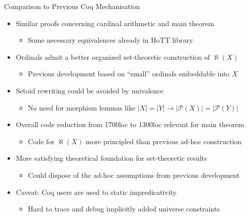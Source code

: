 \documentclass[xcolor=dvipsnames,compress,aspectratio=169,handout]{beamer}
\newcommand{\MCL}[1]{\ensuremath{\mathcal{#1}}\xspace} %
\newcommand{\Pow}{\MCL P}
\begin{document}
\begin{frame}{Comparison to Previous Coq Mechanisation}
	\pause
	\begin{itemize}
		\item
		Similar proofs concerning cardinal arithmetic and main theorem
		\begin{itemize}
			\item Some necessary equivalences already in HoTT library
		\end{itemize}
		\vspace{0.2cm}
		\pause
		\item
		Ordinals admit a better organized set-theoretic construction of $\aleph(X)$
		\begin{itemize}
			\item Previous development based on ``small'' ordinals embeddable into $X$
		\end{itemize}
		\vspace{0.2cm}
		\pause
		\item
		Setoid rewriting could be avoided by univalence
		\begin{itemize}
			\item No need for morphism lemmas like $|X|=|Y|\to |\Pow(X)|=|\Pow(Y)|$
		\end{itemize}
		\vspace{0.2cm}
		\pause
		\item
		Overall code reduction from 1700loc to 1300loc relevant for main theorem
		\begin{itemize}
			\item Code for $\aleph(X)$ more principled than previous ad-hoc construction
		\end{itemize}
		\vspace{0.2cm}
		\pause
		\item
		More satisfying theoretical foundation for set-theoretic results
		\begin{itemize}
			\item
			Could dispose of the ad-hoc assumptions from previous development
		\end{itemize}
		\vspace{0.2cm}
		\pause
		\item
		Caveat: Coq users are used to static impredicativity
		\begin{itemize}
			\item
			Hard to trace and debug implicitly added universe constraints
		\end{itemize}
	\end{itemize}
\end{frame}
\end{document}
